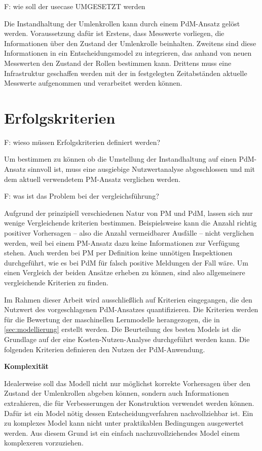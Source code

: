 F: wie soll der usecase UMGESETZT werden

Die Instandhaltung der Umlenkrollen kann durch einem PdM-Ansatz gelöst werden. Voraussetzung dafür ist Erstens, dass Messwerte vorliegen, die Informationen über den Zustand der Umlenkrolle beinhalten. Zweitens sind diese Informationen in ein Entscheidungsmodel zu integrieren, das anhand von neuen Messwerten den Zustand der Rollen bestimmen kann. Drittens muss eine Infrastruktur geschaffen werden mit der in festgelegten Zeitabständen aktuelle Messwerte aufgenommen und verarbeitet werden können.
\section{Erfolgskriterien}
\label{sec:erfolgskriterien_usecase}
F: wieso müssen Erfolgskriterien definiert werden?

Um bestimmen zu können ob die Umstellung der Instandhaltung auf einen PdM-Ansatz sinnvoll ist, muss eine ausgiebige Nutzwertanalyse abgeschlossen und mit dem aktuell verwendetem PM-Ansatz verglichen werden. 

F: was ist das Problem bei der vergleichsführung?

Aufgrund der prinzipiell verschiedenen Natur von PM und PdM, lassen sich nur wenige Vergleichende kriterien bestimmen. Beispielsweise kann die Anzahl richtig positiver Vorhersagen -- also die Anzahl vermeidbarer Ausfälle -- nicht verglichen werden, weil bei einem PM-Ansatz dazu keine Informationen zur Verfügung stehen. Auch werden bei PM per Definition keine unnötigen Inspektionen durchgeführt, wie es bei PdM für falsch positive Meldungen der Fall wäre. Um einen Vergleich der beiden Ansätze erheben zu können, sind also allgemeinere vergleichende Kriterien zu finden.

Im Rahmen dieser Arbeit wird ausschließlich auf Kriterien eingegangen, die den Nutzwert des vorgeschlagenen PdM-Ansatzes quantifizieren. Die Kriterien werden für die Bewertung der maschinellen Lernmodelle herangezogen, die in \cref{sec:modellierung} erstellt werden. Die Beurteilung des besten Models ist die Grundlage auf der eine Kosten-Nutzen-Analyse durchgeführt werden kann. Die folgenden Kriterien definieren den Nutzen der PdM-Anwendung.

\textbf{Komplexität}

Idealerweise soll das Modell nicht nur möglichst korrekte Vorhersagen über den Zustand der Umlenkrollen abgeben können, sondern auch Informationen extrahieren, die für Verbesserungen der Konstruktion verwendet werden können. Dafür ist ein Model nötig dessen Entscheidungverfahren nachvollziehbar ist. Ein zu komplexes Model kann nicht unter praktikablen Bedingungen ausgewertet werden. Aus diesem Grund ist ein einfach nachzuvollziehendes Model einem komplexeren vorzuziehen.

